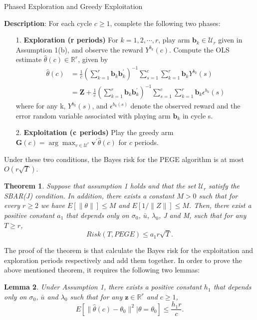 \documentclass{article}
\newtheorem{theorem}{Theorem}
\newtheorem{lemma}[theorem]{Lemma}
\theoremstyle{plain}
\theoremstyle{definition}
\begin{document}
\begin{algorithm}\label{alg:PEGE}
\caption{Phased Exploration and Greedy Exploitation}
\textbf{Description}: For each cycle $c\geq 1$, complete the following two phases:
\begin{itemize}
\item [1. ] \textbf{Exploration (r periods)} For $k=1,2,\cdots,r$, play arm $\textbf{b}_{k}\in \mathcal{U}_{r}$ given in Assumption 1(b), and observe the reward $Y^{b_{k}}(c)$. Compute the OLS estimate $\hat{\theta}(c)\in \mathbb{R}^{r}$, given by
\begin{align}
\hat{\theta}(c)&=\frac{1}{c}(\sum_{k=1}^{r}\textbf{b}_{k}\textbf{b}_{k}^{'})^{-1}\sum_{s=1}^{c}\sum_{k=1}^{r}\textbf{b}_{k}Y^{b_{k}}(s) \nonumber \\
&=\textbf{Z}+\frac{1}{c}(\sum_{k=1}^{r}\textbf{b}_{k}\textbf{b}_{k}^{'})^{-1}\sum_{s=1}^{c}\sum_{k=1}^{r}\textbf{b}_{k}\epsilon^{b_{k}}(s) \nonumber 
\end{align}
where for any k, $Y^{b_{k}}(s)$, and $\epsilon^{b_{k}(s)}$ denote the observed reward and the error random variable associated with playing arm $\textbf{b}_{k}$ in cycle s.
\item [2. ] \textbf{Exploitation ($\bold{c}$ periods)} Play the greedy arm $\textbf{G}(c)=\arg \max_{v\in \mathcal{U}^{r}}\textbf{v}^{'}\hat{\theta}(c)$ for $c$ periods.
\end{itemize}
\end{algorithm}


Under these two conditions, the Bayes risk for the PEGE algorithm is at most $O(r\sqrt{T})$.

\begin{theorem}
Suppose that assumption 1 holds and that the set $\mathcal{U}_{r}$ satisfy the SBAR(J) condition. In addition, there exists a constant $M>0$ such that for every $r\geq 2$ we have $E[\|\theta\|]\leq M$ and $E[1/\|Z\|]\leq M$. Then, there exist a positive constant $a_{1}$ that depends only on $\sigma_{0}$, $\bar{u}$, $\lambda_{0}$, J and M, such that for any $T\geq r$,
\begin{equation}
Risk(T,PEGE)\leq a_{1}r\sqrt{T}. \nonumber 
\end{equation}

\end{theorem}

The proof of the theorem is that calculate the Bayes risk for the exploitation and exploration periods respectively and add them together. In order to prove the above mentioned theorem, it requires the following two lemmas:
\begin{lemma}
Under Assumption 1, there exists a positive constant $h_{1}$ that depends only on $\sigma_{0}$, $\bar{u}$ and $\lambda_{0}$ such that for any $\textbf{z}\in \mathbb{R}^{r}$ and $c\geq 1$,
\begin{equation}
E\left[\|\hat{\theta}(c)-\theta_{0}\|^{2}|\theta=\theta_{0}\right]\leq \frac{h_{1}r}{c}. 
\end{equation} 
\end{lemma}
\end{document}
